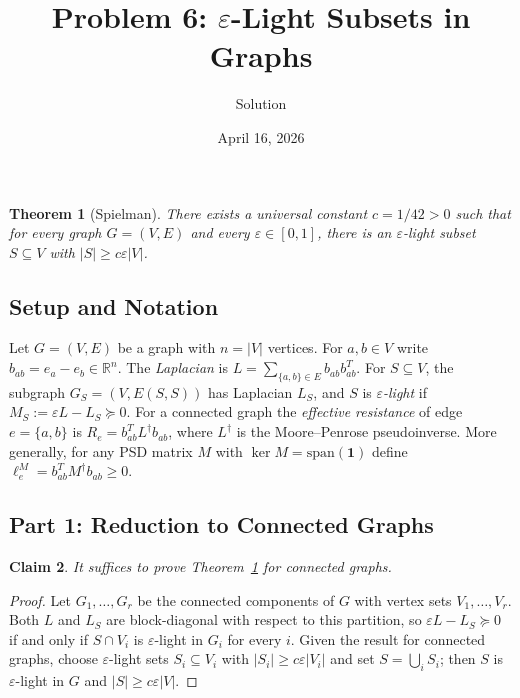 \documentclass[12pt]{article}
\title{Problem 6: $\varepsilon$-Light Subsets in Graphs}
\author{Solution}
\date{April 16, 2026}
\newtheorem{theorem}{Theorem}
\newtheorem{claim}[theorem]{Claim}
\begin{document}
\maketitle

\begin{theorem}[Spielman]
\label{thm:main}
There exists a universal constant $c = 1/42 > 0$ such that for every graph
$G = (V,E)$ and every $\varepsilon \in [0,1]$, there is an $\varepsilon$-light
subset $S \subseteq V$ with $|S| \geq c\varepsilon|V|$.
\end{theorem}

\subsection*{Setup and Notation}

Let $G=(V,E)$ be a graph with $n = |V|$ vertices. For $a,b\in V$ write
$b_{ab} = e_a - e_b \in \mathbb{R}^n$.  The \emph{Laplacian} is
$L = \sum_{\{a,b\}\in E}b_{ab}b_{ab}^T$.
For $S\subseteq V$, the subgraph $G_S = (V, E(S,S))$ has Laplacian $L_S$,
and $S$ is \emph{$\varepsilon$-light} if $M_S := \varepsilon L - L_S \succeq 0$.
For a connected graph the \emph{effective resistance} of edge $e=\{a,b\}$ is
$R_e = b_{ab}^T L^\dagger b_{ab}$, where $L^\dagger$ is the Moore--Penrose
pseudoinverse.  More generally, for any PSD matrix $M$ with
$\ker M = \mathrm{span}(\mathbf{1})$ define
$\ell_e^M = b_{ab}^T M^\dagger b_{ab} \geq 0$.

\subsection*{Part 1: Reduction to Connected Graphs}

\begin{claim}\label{claim:reduction}
It suffices to prove Theorem~\ref{thm:main} for connected graphs.
\end{claim}
\begin{proof}
Let $G_1,\ldots,G_r$ be the connected components of $G$ with vertex sets
$V_1,\ldots,V_r$.  Both $L$ and $L_S$ are block-diagonal with respect to this
partition, so $\varepsilon L - L_S \succeq 0$ if and only if $S\cap V_i$ is
$\varepsilon$-light in $G_i$ for every $i$.  Given the result for connected
graphs, choose $\varepsilon$-light sets $S_i\subseteq V_i$ with
$|S_i|\geq c\varepsilon|V_i|$ and set $S=\bigcup_i S_i$; then $S$ is
$\varepsilon$-light in $G$ and $|S|\geq c\varepsilon|V|$.
\end{proof}
\end{document}
